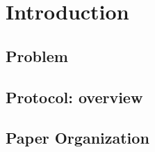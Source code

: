 \section{\textbf{Introduction}}

\subsection{Problem}

\subsection{Protocol: overview}

\subsection{Paper Organization}


